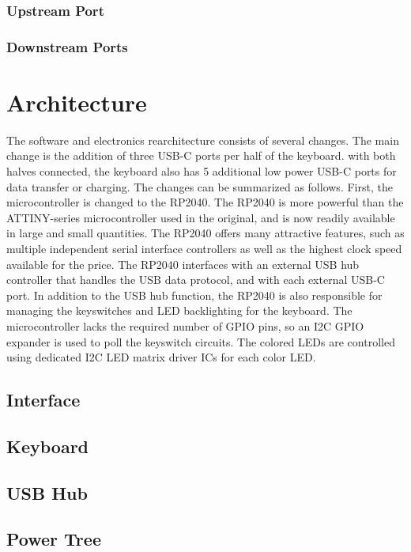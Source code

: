 \documentclass[10pt]{report}
\begin{document}
\subsection{Upstream Port}

\subsection{Downstream Ports}

\chapter{Architecture}

The software and electronics rearchitecture consists of several changes. The main change is the addition of three USB-C ports per half of the keyboard. with both halves connected, the keyboard also has 5 additional low power USB-C ports for data transfer or charging. The changes can be summarized as follows. First, the microcontroller is changed to the RP2040. The RP2040 is more powerful than the ATTINY-series microcontroller used in the original, and is now readily available in large and small quantities. The RP2040 offers many attractive features, such as multiple independent serial interface controllers as well as the highest clock speed available for the price. The RP2040 interfaces with an external USB hub controller that handles the USB data protocol, and with each external USB-C port. In addition to the USB hub function, the RP2040 is also responsible for managing the keyswitches and LED backlighting for the keyboard. The microcontroller lacks the required number of GPIO pins, so an I2C GPIO expander is used to poll the keyswitch circuits. The colored LEDs are controlled using dedicated I2C LED matrix driver ICs for each color LED.

\section{Interface}

\section{Keyboard}

\section{USB Hub}

\section{Power Tree}
\end{document}
